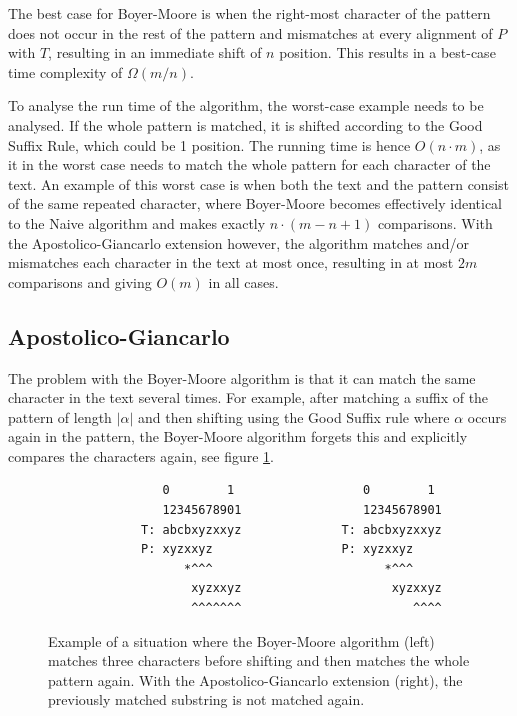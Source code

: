 The best case for Boyer-Moore is when the right-most character of the pattern does not occur in the rest of the pattern and mismatches at every alignment of $P$ with $T$, resulting in an immediate shift of $n$ position. This results in a best-case time complexity of $\Omega(m/n)$. 

To analyse the run time of the algorithm, the worst-case example needs to be analysed. If the whole pattern is matched, it is shifted according to the Good Suffix Rule, which could be 1 position. The running time is hence $O(n\cdot m)$, as it in the worst case needs to match the whole pattern for each character of the text. An example of this worst case is when both the text and the pattern consist of the same repeated character, where Boyer-Moore becomes effectively identical to the Naive algorithm and makes exactly $n\cdot(m-n+1)$ comparisons. With the Apostolico-Giancarlo extension however, the algorithm matches and/or mismatches each character in the text at most once, resulting in at most $2m$ comparisons and giving $O(m)$ in all cases. 

\subsection{Apostolico-Giancarlo}

The problem with the Boyer-Moore algorithm is that it can match the same character in the text several times. For example, after matching a suffix of the pattern of length $|\alpha|$ and then shifting using the Good Suffix rule where $\alpha$ occurs again in the pattern, the Boyer-Moore algorithm forgets this and explicitly compares the characters again, see figure \ref{fig:apostolicoexample}. 

\begin{figure}[ht!]
\begin{verbatim}
                0        1                  0        1 
                12345678901                 12345678901
             T: abcbxyzxxyz              T: abcbxyzxxyz
             P: xyzxxyz                  P: xyzxxyz    
                   *^^^                        *^^^    
                    xyzxxyz                     xyzxxyz
                    ^^^^^^^                        ^^^^
\end{verbatim}
\caption{Example of a situation where the Boyer-Moore algorithm (left) matches three characters before shifting and then matches the whole pattern again. With the Apostolico-Giancarlo extension (right), the previously matched substring is not matched again. }
\label{fig:apostolicoexample}
\end{figure}


